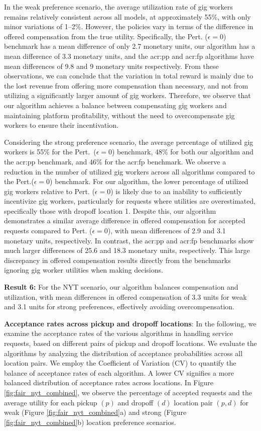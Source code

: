 In the weak preference scenario, the average utilization rate of gig workers remains relatively consistent across all models, at approximately 55\%, with only minor variations of 1–2\%. However, the policies vary in terms of the difference in offered compensation from the true utility. Specifically, the Pert. ($\epsilon=0$) benchmark has a mean difference of only 2.7 monetary units, our algorithm has a mean difference of 3.3 monetary units, and the \gls{acr:pp} and \gls{acr:fp} algorithms have mean differences of 9.8 and 9 monetary units respectively. From these observations, we can conclude that the variation in total reward is mainly due to the lost revenue from offering more compensation than necessary, and not from utilizing a significantly larger amount of gig workers. Therefore, we observe that our algorithm achieves a balance between compensating gig workers and maintaining platform profitability, without the need to overcompensate gig workers to ensure their incentivation.

Considering the strong preference scenario, the average percentage of utilized gig workers is 55\% for the Pert.~($\epsilon=0$) benchmark, 48\% for both our algorithm and the \gls{acr:pp} benchmark, and 46\% for the \gls{acr:fp} benchmark. We observe a reduction in the number of utilized gig workers across all algorithms compared to the Pert.($\epsilon=0$) benchmark. For our algorithm, the lower percentage of utilized gig workers relative to Pert. ($\epsilon=0$) is likely due to an inability to sufficiently incentivize gig workers, particularly for requests where utilities are overestimated, specifically those with dropoff location 1. Despite this, our algorithm demonstrates a similar average difference in offered compensation for accepted requests compared to Pert. ($\epsilon=0$), with mean differences of 2.9 and 3.1 monetary units, respectively. In contrast, the \gls{acr:pp} and \gls{acr:fp} benchmarks show much larger differences of 25.6 and 18.3 monetary units, respectively. This large discrepancy in offered compensation results directly from the benchmarks ignoring gig worker utilities when making decisions.

\noindent \textbf{Result 6:} For the NYT scenario, our algorithm balances compensation and utilization, with mean differences in offered compensation of 3.3 units for weak and 3.1 units for strong preferences, effectively avoiding overcompensation.

\noindent \textbf{Acceptance rates across pickup and dropoff locations}: In the following, we examine the acceptance rates of the various algorithms in handling service requests, based on different pairs of pickup and dropoff locations. We evaluate the algorithms by analyzing the distribution of acceptance probabilities across all location pairs. We employ the Coefficient of Variation (CV) to quantify the balance of acceptance rates of each algorithm. A lower CV signifies a more balanced distribution of acceptance rates across locations. In Figure \ref{fig:fair_nyt_combined}, we observe the percentage of accepted requests and the average utility for each pickup $(p)$ and dropoff $(d)$ location pair $(p,d)$ for weak (Figure \ref{fig:fair_nyt_combined}a) and strong (Figure \ref{fig:fair_nyt_combined}b) location preference scenarios.

